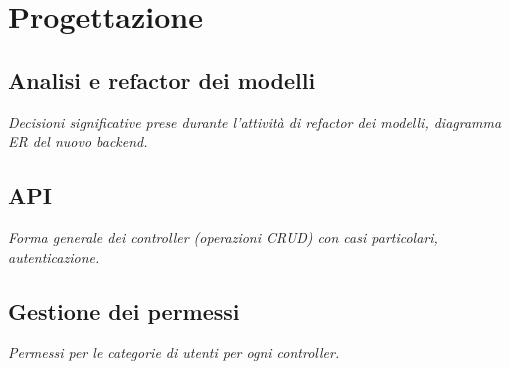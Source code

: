\chapter{Progettazione}
\label{cap:progettazione}

\section{Analisi e refactor dei modelli}
\emph{Decisioni significative prese durante l'attività di refactor dei modelli, diagramma ER del nuovo backend.}

\section{API}
\emph{Forma generale dei controller (operazioni CRUD) con casi particolari, autenticazione.}

\section{Gestione dei permessi}
\emph{Permessi per le categorie di utenti per ogni controller.}

